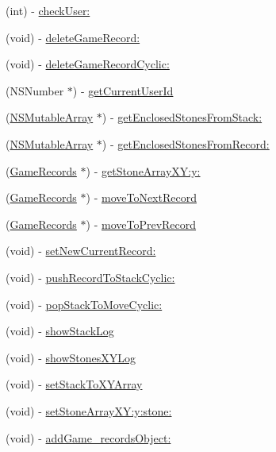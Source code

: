 \begin{DoxyCompactItemize}
(int) -\/ \hyperlink{interface_games_a0272aef1d669a1162b8025ff0eccd8df}{checkUser:}
\item 
(void) -\/ \hyperlink{interface_games_a19e7645f03f70e1215390106d8e5ff3a}{deleteGameRecord:}
\item 
(void) -\/ \hyperlink{interface_games_a66ef016bdf75662d0368b7726aca5fb3}{deleteGameRecordCyclic:}
\item 
(NSNumber $\ast$) -\/ \hyperlink{interface_games_a27c81a4af36aceb98772b9ac610e6135}{getCurrentUserId}
\item 
(\hyperlink{class_n_s_mutable_array}{NSMutableArray} $\ast$) -\/ \hyperlink{interface_games_a3c209384d054a75c0e08a5e1107ead3f}{getEnclosedStonesFromStack:}
\item 
(\hyperlink{class_n_s_mutable_array}{NSMutableArray} $\ast$) -\/ \hyperlink{interface_games_a7fd9604cfb14891c48455538ae2c7582}{getEnclosedStonesFromRecord:}
\item 
(\hyperlink{interface_game_records}{GameRecords} $\ast$) -\/ \hyperlink{interface_games_aec8599f725ed45a79fea1a19a919f5dd}{getStoneArrayXY:y:}
\item 
(\hyperlink{interface_game_records}{GameRecords} $\ast$) -\/ \hyperlink{interface_games_a2bcadbacf50a9d7e7e45e1372de6ac97}{moveToNextRecord}
\item 
(\hyperlink{interface_game_records}{GameRecords} $\ast$) -\/ \hyperlink{interface_games_a620301ed77395102fdb427c8a0d060cf}{moveToPrevRecord}
\item 
(void) -\/ \hyperlink{interface_games_aed3a13eb47643d1cd4b5b25f0b9582f0}{setNewCurrentRecord:}
\item 
(void) -\/ \hyperlink{interface_games_aad47ae4e9af60c4288ba8a0b61e604d3}{pushRecordToStackCyclic:}
\item 
(void) -\/ \hyperlink{interface_games_a882c82102ab5be113a0f7a2c7c782ca9}{popStackToMoveCyclic:}
\item 
(void) -\/ \hyperlink{interface_games_a585c2b097394ef607f29d2a36a113c1a}{showStackLog}
\item 
(void) -\/ \hyperlink{interface_games_ad6eacd14dcf954b902b66b445b1a5c6c}{showStonesXYLog}
\item 
(void) -\/ \hyperlink{interface_games_a18c5e32f0ce44370f981950e8f4121e4}{setStackToXYArray}
\item 
(void) -\/ \hyperlink{interface_games_aa388a32904aa9d1545fc045b0abc149f}{setStoneArrayXY:y:stone:}
\item 
(void) -\/ \hyperlink{interface_games_a00f0d0456bde50486d6144218ec608f8}{addGame\_\-recordsObject:}

\end{DoxyCompactItemize}

